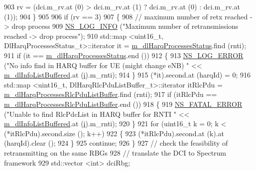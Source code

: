 \begin{DoxyCode}
903               rv = (dci.m\_rv.at (0) > dci.m\_rv.at (1) ? dci.m\_rv.at (0) : dci.m\_rv.at (1));
904             \}
905 
906           \textcolor{keywordflow}{if} (rv == 3)
907             \{
908               \textcolor{comment}{// maximum number of retx reached -> drop process}
909               \hyperlink{group__logging_gafbd73ee2cf9f26b319f49086d8e860fb}{NS\_LOG\_INFO} (\textcolor{stringliteral}{"Maximum number of retransmissions reached -> drop process"});
910               std::map <uint16\_t, DlHarqProcessesStatus\_t>::iterator it = 
      \hyperlink{classns3_1_1PssFfMacScheduler_aaddeb3fa864cb82b5829d4ca1cf9abea}{m\_dlHarqProcessesStatus}.find (rnti);
911               \textcolor{keywordflow}{if} (it == \hyperlink{classns3_1_1PssFfMacScheduler_aaddeb3fa864cb82b5829d4ca1cf9abea}{m\_dlHarqProcessesStatus}.end ())
912                 \{
913                   \hyperlink{group__logging_ga0261a8db1d4ac5f79417d117634fd455}{NS\_LOG\_ERROR} (\textcolor{stringliteral}{"No info find in HARQ buffer for UE (might change eNB) "} << 
      \hyperlink{classns3_1_1PssFfMacScheduler_a3a7d9c7460c66767201d15a1d6f58758}{m\_dlInfoListBuffered}.at (\hyperlink{bernuolliDistribution_8m_a6f6ccfcf58b31cb6412107d9d5281426}{i}).m\_rnti);
914                 \}
915               (*it).second.at (harqId) = 0;
916               std::map <uint16\_t, DlHarqRlcPduListBuffer\_t>::iterator itRlcPdu =  
      \hyperlink{classns3_1_1PssFfMacScheduler_a0f31f16c2a9f067c6189462a9797e06b}{m\_dlHarqProcessesRlcPduListBuffer}.find (rnti);
917               \textcolor{keywordflow}{if} (itRlcPdu == \hyperlink{classns3_1_1PssFfMacScheduler_a0f31f16c2a9f067c6189462a9797e06b}{m\_dlHarqProcessesRlcPduListBuffer}.end ())
918                 \{
919                   \hyperlink{group__fatal_ga5131d5e3f75d7d4cbfd706ac456fdc85}{NS\_FATAL\_ERROR} (\textcolor{stringliteral}{"Unable to find RlcPdcList in HARQ buffer for RNTI "} << 
      \hyperlink{classns3_1_1PssFfMacScheduler_a3a7d9c7460c66767201d15a1d6f58758}{m\_dlInfoListBuffered}.at (\hyperlink{bernuolliDistribution_8m_a6f6ccfcf58b31cb6412107d9d5281426}{i}).m\_rnti);
920                 \}
921               \textcolor{keywordflow}{for} (uint16\_t k = 0; k < (*itRlcPdu).second.size (); k++)
922                 \{
923                   (*itRlcPdu).second.at (k).at (harqId).clear ();
924                 \}
925               \textcolor{keywordflow}{continue};
926             \}
927           \textcolor{comment}{// check the feasibility of retransmitting on the same RBGs}
928           \textcolor{comment}{// translate the DCI to Spectrum framework}
929           std::vector <int> dciRbg;

\end{DoxyCode}
